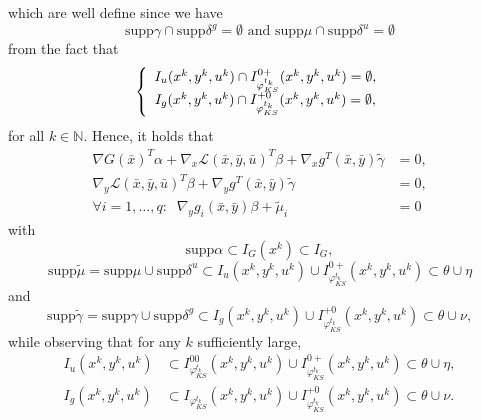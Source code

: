        	which are well define since we have
       	\begin{equation}
       	\mathrm{supp}\gamma\cap\mathrm{supp}\delta^{g}=\emptyset\text{ \ and
       		\ }\mathrm{supp}\mu\cap\mathrm{supp}\delta^{u}=\emptyset\label{k24}%
       	\end{equation}
       	from the fact that
       	\[
       	\left\{
       	\begin{array}
       	[c]{c}
       	I_{u}(x^{k},y^{k},u^{k})\cap I_{\varphi^{t_{k}}_{KS}}^{0+}(x^{k},y^{k},u^{k})=\emptyset,\\
       	I_{g}(x^{k},y^{k},u^{k})\cap I_{\varphi^{t_{k}}_{KS}}^{+0}(x^{k},y^{k},u^{k})=\emptyset,
       	\end{array}
       	\right.
       	\]
       	for all $k\in\mathbb{N}$. Hence, it holds that
       	\begin{align}
       	\nabla G(\bar{x})^{T}\alpha+\nabla_{x}\mathcal{L}(\bar{x},\bar{y},\bar{u}
       	)^{T}\beta+\nabla_{x}g^{T}(\bar{x},\bar{y})\tilde{\gamma}  & =0,\label{K22}\\
       	\nabla_{y}\mathcal{L}(\bar{x},\bar{y},\bar{u})^{T}\beta+\nabla_{y}g^{T}
       	(\bar{x},\bar{y})\tilde{\gamma}  & =0,\label{K23}\\
       	\forall i=1,\ldots, q: \;\; \nabla_{y}g_{i}(\bar{x},\bar{y})\beta+\tilde{\mu}_{i}  & =0 \label{K23b}
       	\end{align}
       	with
       	\begin{equation}
       	\mathrm{supp}\alpha\subset I_{G}(x^{k})\subset I_{G},\label{K26}
       	\end{equation}%
       	\begin{equation}
       	\mathrm{supp}\tilde{\mu}=\mathrm{supp}\mu\cup\mathrm{supp}\delta^{u}\subset
       	I_{u}(x^{k},y^{k},u^{k})\cup I_{\varphi^{t_{k}}_{KS}}^{0+}(x^{k},y^{k},u^{k}
     )\subset\theta\cup\eta\label{K27}
       	\end{equation}
       	and
       	\begin{equation}
       	\mathrm{supp}\tilde{\gamma}=\mathrm{supp}\gamma\cup\mathrm{supp}\delta
       	^{g}\subset I_{g}(x^{k},y^{k},u^{k})\cup I_{\varphi^{t_{k}}_{KS}}^{+0}(x^{k},y^{k},u^{k})\subset\theta\cup\nu,\label{K28}%
       	\end{equation}
       	while observing that for any $k$ sufficiently large,%
       	\begin{align*}
       	I_{u}(x^{k},y^{k},u^{k})  & \subset I_{\varphi^{t_{k}}_{KS}}^{00}(x^{k},y^{k}
       	,u^{k})\cup I_{\varphi^{t_{k}}_{KS}}^{0+}(x^{k},y^{k},u^{k})\subset\theta\cup
       	\eta,\\
       	I_{g}(x^{k},y^{k},u^{k})  & \subset I_{\varphi^{t_{k}}_{KS}}(x^{k},y^{k}
       	,u^{k})\cup I_{\varphi^{t_{k}}_{KS}}^{+0}(x^{k},y^{k},u^{k})\subset\theta\cup\nu.
       	\end{align*}
